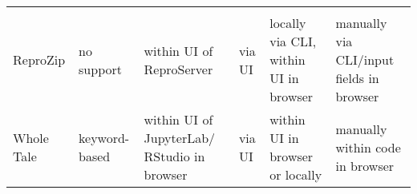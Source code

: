 \documentclass[onecolumn]{article}
\begin{document}
\begin{longtable}[]{@{}llllll@{}}
\begin{minipage}[t]{0.15\columnwidth}
\end{minipage}\tabularnewline
\begin{minipage}[t]{0.12\columnwidth}\raggedright
ReproZip\strut
\end{minipage} & \begin{minipage}[t]{0.12\columnwidth}\raggedright
no support\strut
\end{minipage} & \begin{minipage}[t]{0.18\columnwidth}\raggedright
within UI of ReproServer\strut
\end{minipage} & \begin{minipage}[t]{0.09\columnwidth}\raggedright
via UI\strut
\end{minipage} & \begin{minipage}[t]{0.18\columnwidth}\raggedright
locally via CLI, within UI in browser\strut
\end{minipage} & \begin{minipage}[t]{0.15\columnwidth}\raggedright
manually via CLI/input fields in browser\strut
\end{minipage}\tabularnewline
\begin{minipage}[t]{0.12\columnwidth}\raggedright
Whole Tale\strut
\end{minipage} & \begin{minipage}[t]{0.12\columnwidth}\raggedright
keyword-based\strut
\end{minipage} & \begin{minipage}[t]{0.18\columnwidth}\raggedright
within UI of JupyterLab/ RStudio in browser\strut
\end{minipage} & \begin{minipage}[t]{0.09\columnwidth}\raggedright
via UI\strut
\end{minipage} & \begin{minipage}[t]{0.18\columnwidth}\raggedright
within UI in browser or locally\strut
\end{minipage} & \begin{minipage}[t]{0.15\columnwidth}\raggedright
manually within code in browser\strut
\end{minipage}\tabularnewline
\bottomrule
\end{longtable}
\end{document}
